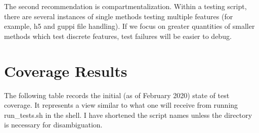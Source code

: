 \documentclass[12pt]{article}
\begin{document}
The second recommendation is compartmentalization. Within a testing script, there are several instances of single methods testing multiple features (for example, h5 and guppi file handling). If we focus on greater quantities of smaller methods which test discrete features, test failures will be easier to debug.

\section{Coverage Results}

\quad \quad The following table records the initial (as of February 2020) state of test coverage. It represents a view similar to what one will receive from running run\_tests.sh in the shell. I have shortened the script names unless the directory is necessary for disambiguation.
\end{document}
